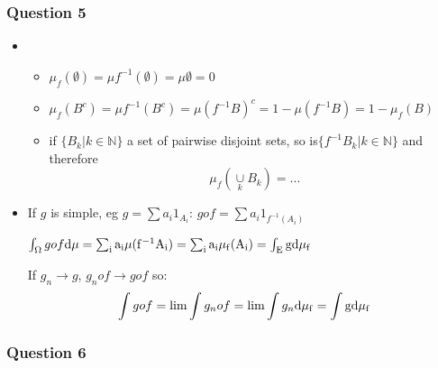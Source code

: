 \documentclass[12pt]{article}
\newcommand{\Q}[1]{\subsubsection*{Question #1}}
\newcommand{\union}[1]{\underset{#1}{\cup} }
\begin{document}
\Q{5}

\begin{itemize}
\item
\begin{itemize}
\item $\mu_f(\emptyset) = \mu f^{-1}(\emptyset) = \mu \emptyset = 0$
\item $\mu_f(B^c) = \mu f^{-1}(B^c) = \mu (f^{-1}B)^c = 1 - \mu(f^{-1}B) = 1 - \mu_f(B)$
\item if $\{B_k | k \in \mathbb{N}\}$ a set of pairwise disjoint sets, so is$\{ f^{-1} B_k | k \in \mathbb{N}\}$ and therefore $$\mu_f(\union{k} B_k) = ...$$
\end{itemize}

\item
If $g$ is simple, eg $g = \sum a_i 1_{A_i}$: $gof = \sum a_i 1_{f^{-1}(A_i)}$

$\int_{\Omega} g o f \rm{d}\mu = \sum_i a_i \mu(f^{-1}A_i) = \sum_i a_i \mu_f(A_i) = \int_E g  \rm{d}\mu_f$

If $g_n \rightarrow g$, $g_nof \rightarrow gof$ so:
$$\int gof = \lim\int g_nof  = \lim \int g_n \rm{d}\mu_f = \int g \rm{d}\mu_f$$
\end{itemize}


\Q{6}
\end{document}

